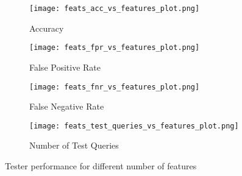 \begin{figure}[h]
     \centering
     \begin{subfigure}[h]{0.4\textwidth}
         \centering
         \texttt{[image: feats\_acc\_vs\_features\_plot.png]}
         \caption{Accuracy}
         \label{fig:feats_acc_vs_features_plot}
     \end{subfigure}
    \hspace{5mm}
     \begin{subfigure}[h]{0.4\textwidth}
         \centering
         \texttt{[image: feats\_fpr\_vs\_features\_plot.png]}
         \caption{False Positive Rate}
         \label{fig:feats_fpr_vs_features_plot}
     \end{subfigure}
     \hspace{5mm}
     \begin{subfigure}[h]{0.4\textwidth}
         \centering
         \texttt{[image: feats\_fnr\_vs\_features\_plot.png]}
         \caption{False Negative Rate}
         \label{fig:feats_fnr_vs_features_plot}
     \end{subfigure}
     \hspace{5mm}
    \begin{subfigure}[h]{0.4\textwidth}
         \centering
         \texttt{[image: feats\_test\_queries\_vs\_features\_plot.png]}
         \caption{Number of Test Queries}
         \label{fig:feats_test_queries_vs_features_plot}
     \end{subfigure}
    \caption{Tester performance for different number of features}
    \label{fig:tester_perf_diff_feats}
\end{figure}

